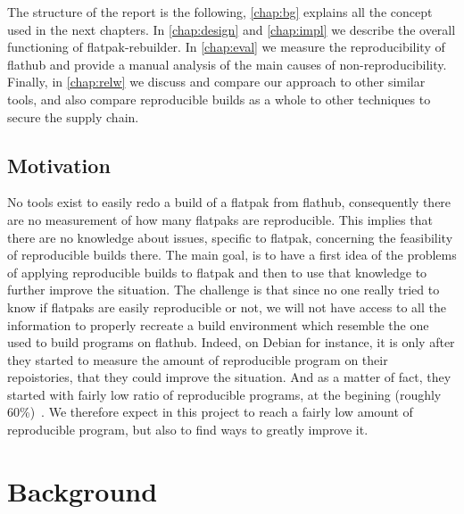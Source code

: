 \documentclass[a4paper,11pt,oneside]{report}
\theoremstyle{definition}
\newcommand{\sysname}{flatpak-rebuilder\xspace}
\newcommand{\rb}{reproducible builds\xspace}
\newcommand{\fp}{flatpak\xspace}
\newcommand{\fh}{flathub\xspace}
\begin{document}
The structure of the report is the following, \autoref{chap:bg} explains all
the concept used in the next chapters. In \autoref{chap:design} and
\autoref{chap:impl} we describe the overall functioning of \sysname. In
\autoref{chap:eval} we measure the reproducibility of \fh and provide a manual
analysis of the main causes of non-reproducibility. Finally, in
\autoref{chap:relw} we discuss and compare our approach to other similar tools,
and also compare \rb as a whole to other techniques to secure the supply chain.

\section{Motivation}
No tools exist to easily redo a build of a \fp from \fh, consequently there are
no measurement of how many flatpaks are reproducible. This implies that there
are no knowledge about issues, specific to \fp, concerning the feasibility of
\rb there. The main goal, is to have a first idea of the problems of applying
\rb to \fp and then to use that knowledge to further improve the situation. The
challenge is that since no one really tried to know if flatpaks are easily
reproducible or not, we will not have access to all the information to properly
recreate a build environment which resemble the one used to build programs on
\fh. Indeed, on Debian for instance, it is only after they started to measure
the amount of reproducible program on their repoistories, that they could
improve the situation. And as a matter of fact, they started with fairly low
ratio of reproducible programs, at the begining (roughly
60\%)~\cite{debian:repro}. We therefore expect in this project to reach a
fairly low amount of reproducible program, but also to find ways to greatly
improve it.


\chapter{Background}
\label{chap:bg}
\end{document}
